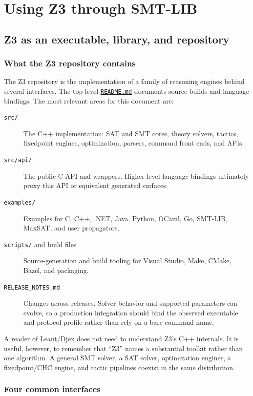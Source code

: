 \documentclass[10pt,letterpaper,oneside]{report}
\newcommand{\filepath}[1]{\nolinkurl{#1}}
\def\ZthreeCommit{bc4585e0ba5b1041f301b0c16ba652645729e796}
\def\ZthreeBase{https://github.com/Z3Prover/z3/blob/\ZthreeCommit/}
\newcommand{\zpath}[1]{\href{\ZthreeBase#1}{\nolinkurl{#1}}}
\begin{document}
\part{Using Z3 through SMT-LIB}

\chapter{Z3 as an executable, library, and repository}
\label{chap:z3-interfaces}

\section{What the Z3 repository contains}

The Z3 repository is the implementation of a family of reasoning engines behind several interfaces. The top-level \zpath{README.md} documents source builds and language bindings. The most relevant areas for this document are:

\begin{description}
\item[\filepath{src/}] The C++ implementation: SAT and SMT cores, theory solvers, tactics, fixedpoint engines, optimization, parsers, command front ends, and APIs.
\item[\filepath{src/api/}] The public C API and wrappers. Higher-level language bindings ultimately proxy this API or equivalent generated surfaces.
\item[\filepath{examples/}] Examples for C, C++, .NET, Java, Python, OCaml, Go, SMT-LIB, MaxSAT, and user propagators.
\item[\filepath{scripts/} and build files] Source-generation and build tooling for Visual Studio, Make, CMake, Bazel, and packaging.
\item[\filepath{RELEASE_NOTES.md}] Changes across releases. Solver behavior and supported parameters can evolve, so a production integration should bind the observed executable and protocol profile rather than rely on a bare command name.
\end{description}

A reader of Leant/Djex does not need to understand Z3's C++ internals. It is useful, however, to remember that ``Z3'' names a substantial toolkit rather than one algorithm. A general SMT solver, a SAT solver, optimization engines, a fixedpoint/CHC engine, and tactic pipelines coexist in the same distribution.

\section{Four common interfaces}
\end{document}

